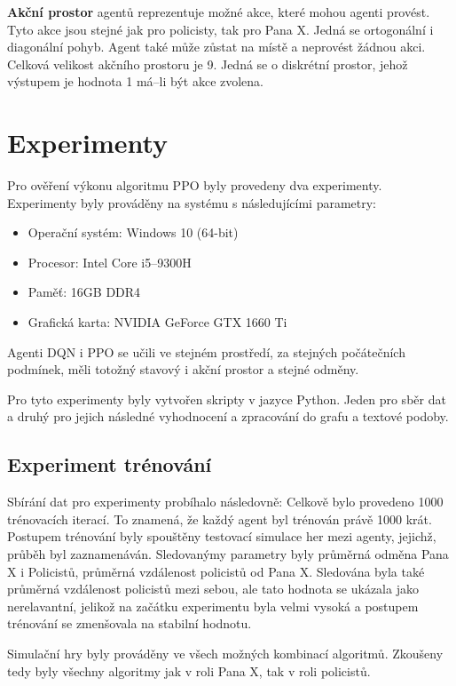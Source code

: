 \bigskip

\textbf{Akční prostor} agentů reprezentuje možné akce, které mohou agenti provést.
Tyto akce jsou stejné jak pro policisty, tak pro Pana X\@.
Jedná se ortogonální i diagonální pohyb.
Agent také může zůstat na místě a neprovést žádnou akci.
Celková velikost akčního prostoru je 9.
Jedná se o diskrétní prostor, jehož výstupem je hodnota 1 má--li být akce zvolena.

\chapter{Experimenty}
\label{ch:experimenty}

Pro ověření výkonu algoritmu PPO byly provedeny dva experimenty.
Experimenty byly prováděny na systému s následujícími parametry:

\begin{itemize}
  \item Operační systém: Windows 10 (64-bit)
  \item Procesor: Intel Core i5--9300H
  \item Paměť: 16GB DDR4
  \item Grafická karta: NVIDIA GeForce GTX 1660 Ti
\end{itemize}


Agenti DQN i PPO se učili ve stejném prostředí, za stejných počátečních podmínek, měli totožný stavový i akční prostor a stejné odměny.

Pro tyto experimenty byly vytvořen skripty v jazyce Python.
Jeden pro sběr dat a druhý pro jejich následné vyhodnocení a zpracování do grafu a textové podoby.

\section{Experiment trénování}
\label{sec:experiment-1}

Sbírání dat pro experimenty probíhalo následovně:
Celkově bylo provedeno 1000 trénovacích iterací.
To znamená, že každý agent byl trénován právě 1000 krát.
Postupem trénování byly spouštěny testovací simulace her mezi agenty, jejichž, průběh byl zaznamenáván.
Sledovanýmy parametry byly průměrná odměna Pana X i Policistů, průměrná vzdálenost policistů od Pana X.
Sledována byla také průměrná vzdálenost policistů mezi sebou, ale tato hodnota se ukázala jako nerelavantní, jelikož na začátku experimentu byla velmi vysoká a postupem trénování se zmenšovala na stabilní hodnotu.

Simulační hry byly prováděny ve všech možných kombinací algoritmů.
Zkoušeny tedy byly všechny algoritmy jak v roli Pana X, tak v roli policistů.

